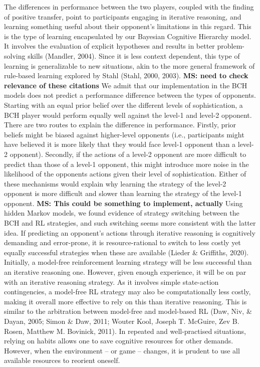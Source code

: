 \documentclass[man,floatsintext]{apa6}
\begin{document}
The differences in performance between the two players, coupled with the finding of positive transfer, point to participants engaging in iterative reasoning, and learning something useful about their opponent's limitations in this regard. This is the type of learning encapsulated by our Bayesian Cognitive Hierarchy model. It involves the evaluation of explicit hypotheses and results in better problem-solving skills (Mandler, 2004). Since it is less context dependent, this type of learning is generalizable to new situations, akin to the more general framework of rule-based learning explored by Stahl (Stahl, 2000, 2003). \textbf{MS: need to check relevance of these citations } We admit that our implementation in the BCH models does not predict a performance difference between the types of opponents. Starting with an equal prior belief over the different levels of sophistication, a BCH player would perform equally well against the level-1 and level-2 opponent. There are two routes to explain the difference in performance. Firstly, prior beliefs might be biased against higher-level opponents (i.e., participants might have believed it is more likely that they would face level-1 opponent than a level-2 opponent). Secondly, if the actions of a level-2 opponent are more difficult to predict than those of a level-1 opponent, this might introduce more noise in the likelihood of the opponents actions given their level of sophistication. Either of these mechanisms would explain why learning the strategy of the level-2 opponent is more difficult and slower than learning the strategy of the level-1 opponent. \textbf{MS: This could be something to implement, actually} Using hidden Markov models, we found evidence of strategy switching between the BCH and RL strategies, and such switching seems more consistent with the latter idea. If predicting an opponent's actions through iterative reasoning is cognitively demanding and error-prone, it is resource-rational to switch to less costly yet equally successful strategies when these are available (Lieder \& Griffiths, 2020). Initially, a model-free reinforcement learning strategy will be less successful than an iterative reasoning one. However, given enough experience, it will be on par with an iterative reasoning strategy. As it involves simple state-action contingencies, a model-free RL strategy may also be computationally less costly, making it overall more effective to rely on this than iterative reasoning. This is similar to the arbitration between model-free and model-based RL (Daw, Niv, \& Dayan, 2005; Simon \& Daw, 2011; Wouter Kool, Joseph T. McGuire, Zev B. Rosen, Matthew M. Bovinick, 2011). In repeated and well-practised situations, relying on habits allows one to save cognitive resources for other demands. However, when the environment -- or game -- changes, it is prudent to use all available resources to reorient oneself.
\end{document}
